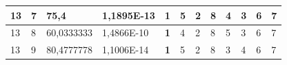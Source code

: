 \documentclass[conference]{IEEEtran}
\begin{document}
\begin{table}[]
\begin{tabular}{|llll|llllllll|}
\multicolumn{1}{|l|}{13}                                                    & \multicolumn{1}{l|}{7}                                                        & \multicolumn{1}{l|}{75,4}                                                         & 1,1895E-13                     & \multicolumn{1}{l|}{\textbf{1}}                                         & \multicolumn{1}{l|}{5}                                                  & \multicolumn{1}{l|}{2}                                                  & \multicolumn{1}{l|}{8}                                                  & \multicolumn{1}{l|}{4}                                                  & \multicolumn{1}{l|}{3}                                                  & \multicolumn{1}{l|}{6}                                                  & 7                          \\ \hline
\multicolumn{1}{|l|}{13}                                                    & \multicolumn{1}{l|}{8}                                                        & \multicolumn{1}{l|}{60,0333333}                                                   & 1,4866E-10                     & \multicolumn{1}{l|}{\textbf{1}}                                         & \multicolumn{1}{l|}{4}                                                  & \multicolumn{1}{l|}{2}                                                  & \multicolumn{1}{l|}{8}                                                  & \multicolumn{1}{l|}{5}                                                  & \multicolumn{1}{l|}{3}                                                  & \multicolumn{1}{l|}{6}                                                  & 7                          \\ \hline
\multicolumn{1}{|l|}{13}                                                    & \multicolumn{1}{l|}{9}                                                        & \multicolumn{1}{l|}{80,4777778}                                                   & 1,1006E-14                     & \multicolumn{1}{l|}{\textbf{1}}                                         & \multicolumn{1}{l|}{5}                                                  & \multicolumn{1}{l|}{2}                                                  & \multicolumn{1}{l|}{8}                                                  & \multicolumn{1}{l|}{3}                                                  & \multicolumn{1}{l|}{4}                                                  & \multicolumn{1}{l|}{6}                                                  & 7                          \\ \hline

\end{tabular}
\end{table}
\end{document}
